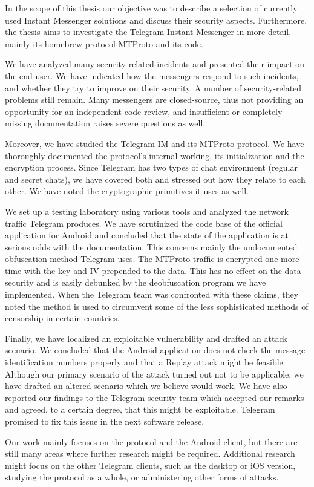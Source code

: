 \documentclass[thesis=M,english]{FITthesis}[2012/10/20]
\begin{document}
\begin{conclusion}

In the scope of this thesis our objective was to describe a selection of currently used Instant Messenger solutions and discuss their security aspects. Furthermore, the thesis aims to investigate the Telegram Instant Messenger in more detail, mainly its homebrew protocol MTProto and its code.

We have analyzed many security-related incidents and presented their impact on the end user. We have indicated how the messengers respond to such incidents, and whether they try to improve on their security. A number of security-related problems still remain. Many messengers are closed-source, thus not providing an opportunity for an independent code review, and insufficient or completely missing documentation raises severe questions as well.

Moreover, we have studied the Telegram IM and its MTProto protocol. We have thoroughly documented the protocol's internal working, its initialization and the encryption process. Since Telegram has two types of chat environment (regular and secret chats), we have covered both and stressed out how they relate to each other. We have noted the cryptographic primitives it uses as well.

We set up a testing laboratory using various tools and analyzed the network traffic Telegram produces. We have scrutinized the code base of the official application for Android and concluded that the state of the application is at serious odds with the documentation. This concerns mainly the undocumented obfuscation method Telegram uses. The MTProto traffic is encrypted one more time with the key and IV prepended to the data. This has no effect on the data security and is easily debunked by the deobfuscation program we have implemented. When the Telegram team was confronted with these claims, they noted the method is used to circumvent some of the less sophisticated methods of censorship in certain countries.

Finally, we have localized an exploitable vulnerability and drafted an attack scenario. We concluded that the Android application does not check the message identification numbers properly and that a Replay attack might be feasible. Although our primary scenario of the attack turned out not to be applicable, we have drafted an altered scenario which we believe would work. We have also reported our findings to the Telegram security team which accepted our remarks and agreed, to a certain degree, that this might be exploitable. Telegram promised to fix this issue in the next software release.

Our work mainly focuses on the protocol and the Android client, but there are still many areas where further research might be required. Additional research might focus on the other Telegram clients, such as the desktop or iOS version, studying the protocol as a whole, or administering other forms of attacks.


\end{conclusion}
\end{document}
